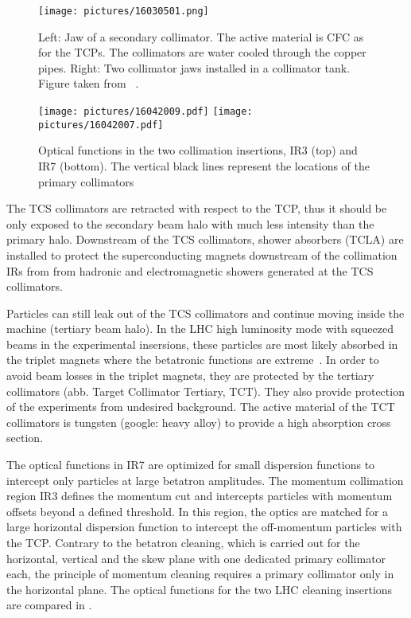 \begin{figure}[t]  
    \centering
    \texttt{[image: pictures/16030501.png]}
    \caption{Left: Jaw of a secondary collimator. The active material is CFC as for the TCPs. The collimators are water cooled through the copper pipes. Right: Two collimator jaws installed in a collimator tank. Figure taken from ~\cite{Bruce2014a}.}  
    \label{pic:16030501}
\end{figure}
% 
\begin{figure}[t]  
    \centering
    \texttt{[image: pictures/16042009.pdf]}
    \texttt{[image: pictures/16042007.pdf]}
    \caption{Optical functions in the two collimation insertions, IR3 (top) and IR7 (bottom). The vertical black lines represent the locations of the 
      primary collimators}  
    \label{pic:16042001}
\end{figure}
%
The TCS collimators are retracted with respect to the TCP, thus it should be only exposed to the secondary beam halo with much less intensity than the primary halo. Downstream of the TCS collimators, shower absorbers (TCLA) are installed to protect the superconducting magnets downstream of the collimation IRs from from hadronic and electromagnetic showers generated at the TCS collimators.

Particles can still leak out of the TCS collimators and continue moving inside the machine (tertiary beam halo). In the LHC high luminosity mode with squeezed beams in the experimental insersions, these particles are most likely absorbed in the triplet magnets where the betatronic functions are extreme~\cite{ipac2012:MOPPD062}. In order to avoid beam losses in the triplet magnets, they are protected by the tertiary collimators (abb. Target Collimator Tertiary, TCT). They also provide protection of the experiments from undesired background. The active material of the TCT collimators is tungsten (google: heavy alloy) to provide a high absorption cross section. 

The optical functions in IR7 are optimized for small dispersion functions to intercept only particles at large betatron amplitudes. The momentum collimation region IR3 defines the momentum cut and intercepts particles with momentum offsets beyond a defined threshold. In this region, the optics are matched for a large horizontal dispersion function to intercept the off-momentum particles with the TCP. Contrary to the betatron cleaning, which is carried out for the horizontal, vertical and the skew plane with one dedicated primary collimator each, the principle of momentum cleaning requires a primary collimator only in the horizontal plane. The optical functions for the two LHC cleaning insertions are compared in .  

